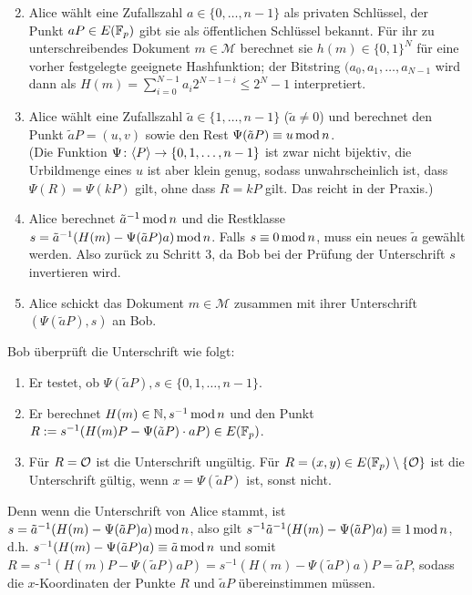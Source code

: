 \begin{anw}
	\begin{enumerate}[(1)]
		\setcounter{enumi}{1}
		\item Alice wählt eine Zufallszahl $a \in \{0,\dots,n-1\}$ als privaten Schlüssel, der Punkt $aP \in E(\mathbb{F}_p)$ gibt sie als öffentlichen Schlüssel bekannt.
		Für ihr zu unterschreibendes Dokument $m \in \mathcal{M}$ berechnet sie $h(m) \in \{0,1\}^N$ für eine vorher festgelegte geeignete Hashfunktion; der Bitstring $(a_0,a_1,\dots,a_{N-1}$ wird dann als $H(m) = \sum_{i=0}^{N-1} a_i 2^{N-1-i} \leq 2^N-1$ interpretiert.
		\item Alice wählt eine Zufallszahl $\tilde{a} \in \{1,\dots,n-1\}$ ($\tilde{a} \neq 0$) und berechnet den Punkt $\tilde{a}P = (u,v)$ sowie den Rest $\Psi(\tilde{a}P) \equiv u \operatorname{mod} n$. \\
		(Die Funktion $\Psi\colon \langle P\rangle \rightarrow \{0,1,\dots,n-1\}$ ist zwar nicht bijektiv, die Urbildmenge eines $u$ ist aber klein genug, sodass unwahrscheinlich ist, dass $\Psi(R) = \Psi(kP)$ gilt, ohne dass $R = kP$ gilt.
		Das reicht in der Praxis.)
		\item Alice berechnet $\tilde{a}^{-1} \operatorname{mod} n$ und die Restklasse $s = \tilde{a}^{-1} (H(m) - \Psi(\tilde{a}P)a) \operatorname{mod} n$.
		Falls $s \equiv 0 \operatorname{mod} n$, muss ein neues $\tilde{a}$ gewählt werden. Also zurück zu Schritt 3, da Bob bei der Prüfung der Unterschrift $s$ invertieren wird.
		\item Alice schickt das Dokument $m \in \mathcal{M}$ zusammen mit ihrer Unterschrift $(\Psi(\tilde{a}P),s)$ an Bob.
	\end{enumerate}
\end{anw}

\begin{anw}[Verifikation]
	Bob überprüft die Unterschrift wie folgt:
	\begin{enumerate}[(1)]
		\item Er testet, ob $\Psi(\tilde{a}P), s \in \{0,1,\dots,n-1\}$.
		\item Er berechnet $H(m) \in \mathbb{N}, s^{-1} \operatorname{mod} n$ und den Punkt $R := s^{-1} (H(m)P - \Psi(\tilde{a}P) \cdot aP) \in E(\mathbb{F}_p)$.
		\item Für $R = \mathcal{O}$ ist die Unterschrift ungültig. Für $R = (x,y) \in E(\mathbb{F}_p) \setminus \{\mathcal{O}\}$ ist die Unterschrift gültig, wenn $x = \Psi(\tilde{a}P)$ ist, sonst nicht.
	\end{enumerate}
\end{anw}

\begin{bem}
	Denn wenn die Unterschrift von Alice stammt, ist $s = \tilde{a}^{-1}(H(m)-\Psi(\tilde{a}P)a) \operatorname{mod} n$, also gilt $s^{-1} \tilde{a}^{-1}(H(m) - \Psi(\tilde{a}P)a) \equiv 1 \operatorname{mod} n$, d.h. $s^{-1}(H(m)-\Psi(\tilde{a}P)a) \equiv \tilde{a} \operatorname{mod} n$ und somit $R = s^{-1}(H(m)P - \Psi(\tilde{a}P)aP) = s^{-1}(H(m)-\Psi(\tilde{a}P)a)P = \tilde{a} P$, sodass die $x$-Koordinaten der Punkte $R$ und $\tilde{a}P$ übereinstimmen müssen.
\end{bem}
